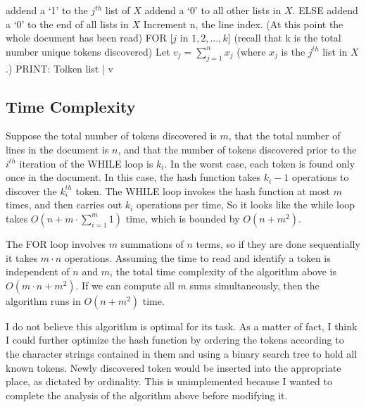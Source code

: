 \documentclass{article}
\begin{document}
{\indent \indent addend a `1' to the $j^{th}$ list of $X $  \newline
\indent \indent addend a `0' to all other lists in $X$. \newline
\indent ELSE \newline
\indent \indent addend a `0' to the end of all lists in $X$ \newline
\indent Increment n, the line index. \newline
(\textnormal{At this point the whole document has been read}) \newline
FOR [$j$ in $1, 2, \dots , k$] \newline
\indent  (\textnormal{recall that k is the total number unique tokens discovered}) \newline
\indent       Let $v_j = \sum^n_{j = 1} x_{j}$ \newline
\indent \indent (\textnormal{where $x_j$ is the $j^{th}$ list in $X$.}) \newline
PRINT: \newline
\indent Tolken list | v \newline
}


\subsection*{Time Complexity}

Suppose the total number of tokens discovered is $m$, that the total number of lines in the document is $n$, and that the number of tokens discovered prior to the $i^{th}$ iteration of the WHILE loop is $k_i$. In the worst case, each token is found only once in the document. In this case, the hash function takes $k_i - 1$ operations to discover the $k_i^{th}$ token. The WHILE loop invokes the hash function at most $m$ times, and then carries out $k_i$ operations per time, So it looks like the while loop takes $O(n + m \cdot \sum_{i = 1}^ m 1 )$ time, which is bounded by $O(n+m^2)$.

 The FOR loop involves $m$ summations of $n$ terms, so if they are done sequentially  it takes $m \cdot n$ operations. Assuming the time to read and identify a token is independent of $n$ and $m$, the total time complexity of the algorithm above is $O(m \cdot n + m^2)$. If we can compute all $m$ sums simultaneously, then the algorithm runs in $O(n + m^2)$ time. 
 
 I do not believe this algorithm is optimal for its task. As a matter of fact, I think I could further optimize the hash function by ordering the tokens according to the character strings contained in them and using a binary search tree to hold all known tokens. Newly discovered token would be inserted into the appropriate place, as dictated by ordinality. This is unimplemented because I wanted to complete the analysis of the algorithm above before modifying it.  
 
\end{document}
